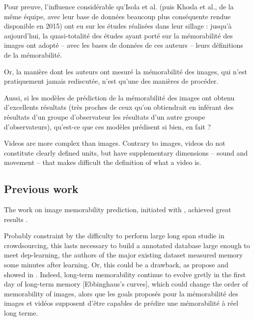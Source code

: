 \documentclass[sigconf]{acmart}
\begin{document}
Pour preuve, l'influence considérable qu'Isola et al. (puis Khosla et al., de la même équipe, avec leur base de données beaucoup plus conséquente rendue disponible en 2015) ont eu sur les études réalisées dans leur sillage : jusqu'à aujourd'hui, la quasi-totalité des études ayant porté sur la mémorabilité des images ont adopté – avec les bases de données de ces auteurs – leurs définitions de la mémorabilité.

Or, la manière dont les auteurs ont mesuré la mémorabilité des images, qui n'est pratiquement jamais rediscutée, n'est qu'une des manières de procéder.

Aussi, si les modèles de prédiction de la mémorabilité des images ont obtenu d'excellents résultats (très proches de ceux qu'on obtiendrait en inférant des résultats d'un groupe d'observateur les résultats d'un autre groupe d'observateurs), qu'est-ce que ces modèles prédisent si bien, en fait ? 

Videos are more complex than images. Contrary to images, videos do not constitute clearly defined units, but have supplementary dimensions -- sound and movement -- that makes difficult the definition of what a video is.


\subsection{Previous work} %
The work on image memorability prediction, initiated with \cite{isola_2011_makes}, achieved great results \cite{khosla_2015_understanding,baveye_2016_deep,squalli_2017_deep}.

Probably constraint by the difficulty to perform large long span studie in crowdsourcing, this lasts necessary to build a annotated database large enough to meet dep-learning, the authors of the major existing dataset \cite{isola_2011_makes,khosla_2015_understanding} measured memory some minutes after learning.
Or, this could be a drawback, as propose and showed in \cite{cohendet_2016_prediction}.
Indeed, long-term memorability continue to evolve gretly in the first day of long-term memory [Ebbinghaus's curves], which could change the order of memorability of images, alors que les goals proposés pour la mémorabilité des images et vidéos supposent d'être capables de prédire une mémorabilité à réel long terme.
\end{document}
